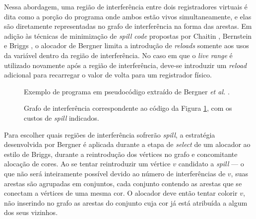 \documentclass[
	12pt,				%
	openright,			%
	oneside,			%
	a4paper,			%
	tccpreliminar,			%
	]{ABNT-DC-UEL}
\begin{document}
Nessa abordagem, uma região de interferência entre dois registradores virtuais é dita como a porção do programa onde ambos estão vivos simultaneamente, e elas são diretamente representadas no grafo de interferência na forma das arestas. Em adição às técnicas de minimização de \textit{spill code} propostas por Chaitin \cite{chaitin:81}, Bernstein \cite{bernstein:89} e Briggs \cite{briggs2:92}, o alocador de Bergner limita a introdução de \textit{reloads} somente aos usos da variável dentro da região de interferência. No caso em que o \textit{live range} é utilizado novamente após a região de interferência, deve-se introduzir um \textit{reload} adicional para recarregar o valor de volta para um registrador físico.

\begin{figure}[hbt]
    \centering
    \caption{Exemplo de programa em pseudocódigo extraído de Bergner \textit{et al.} \cite{bergner:97}.}
    \label{fig:bergner-codigo}
\end{figure}

\begin{figure}[hbt]
        \centering
        \caption{Grafo de interferência correspondente ao código da Figura \ref{fig:bergner-codigo}, com os custos de \textit{spill} indicados.}
        \label{fig:bergner-grafo}
    \end{figure}

Para escolher quais regiões de interferência sofrerão \textit{spill}, a estratégia desenvolvida por Bergner é aplicada durante a etapa de \textit{select} de um alocador ao estilo de Briggs, durante a reintrodução dos vértices no grafo e concomitante alocação de cores. Ao se tentar reintroduzir um vértice $v$ candidato a \textit{spill} --- o que não será inteiramente possível devido ao número de interferências de $v$, suas arestas são agrupadas em conjuntos, cada conjunto contendo as arestas que se conectam a vértices de uma mesma cor. O alocador deve então tentar colorir $v$, não inserindo no grafo as arestas do conjunto cuja cor já está atribuída a algum dos seus vizinhos. 
\end{document}
